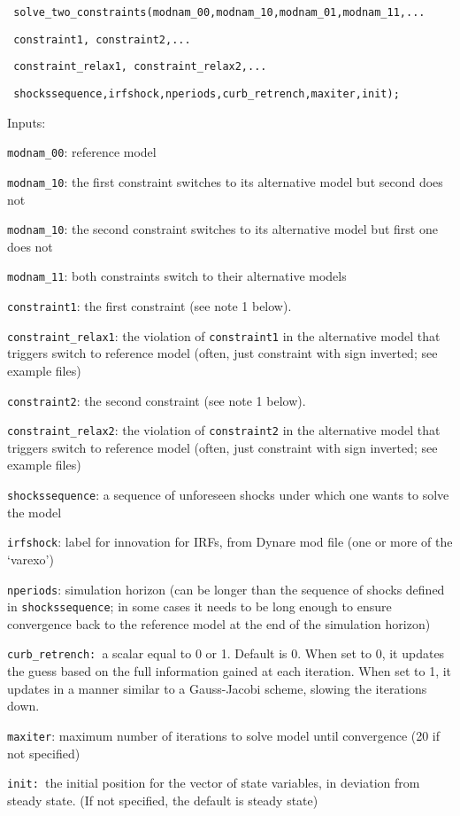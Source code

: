 \documentclass[12pt]{article}
\begin{document}
\begin{enumerate}
\texttt{\
solve\_two\_constraints(modnam\_00,modnam\_10,modnam\_01,modnam\_11,...}

\texttt{\ constraint1, constraint2,...}

\texttt{\ constraint\_relax1, constraint\_relax2,...}

\texttt{\ shockssequence,irfshock,nperiods,curb\_retrench,maxiter,init);}

\medskip

Inputs:

\texttt{modnam\_00}: reference model

\texttt{modnam\_10}: the first constraint switches to its alternative model
but second does not

\texttt{modnam\_10}: the second constraint switches to its alternative model
but first one does not

\texttt{modnam\_11}: both constraints switch to their alternative models

\texttt{constraint1}: the first constraint (see note 1 below).

\texttt{constraint\_relax1}: the violation of \texttt{constraint1} in the
alternative model that triggers switch to reference model (often, just
constraint with sign inverted; see example files)

\texttt{constraint2}: the second constraint (see note 1 below).

\texttt{constraint\_relax2}: the violation of \texttt{constraint2} in the
alternative model that triggers switch to reference model (often, just
constraint with sign inverted; see example files)

\texttt{shockssequence}: a sequence of unforeseen shocks under which one
wants to solve the model

\texttt{irfshock}: label for innovation for IRFs, from Dynare mod file (one
or more of the `varexo')

\texttt{nperiods}: simulation horizon (can be longer than the sequence of
shocks defined in \texttt{shockssequence}; in some cases it needs to be long
enough to ensure convergence back to the reference model at the end of the
simulation horizon)

\texttt{curb\_retrench: }a scalar equal to 0 or 1. Default is 0. When set to
0, it updates the guess based on the full information gained at each
iteration. When set to 1, it updates in a manner similar to a Gauss-Jacobi
scheme, slowing the iterations down.

\texttt{maxiter}: maximum number of iterations to solve model until
convergence (20 if not specified)

\texttt{init: }the initial position for the vector of state variables, in
deviation from steady state. (If not specified, the default is steady state)

\medskip
\end{enumerate}
\end{document}
